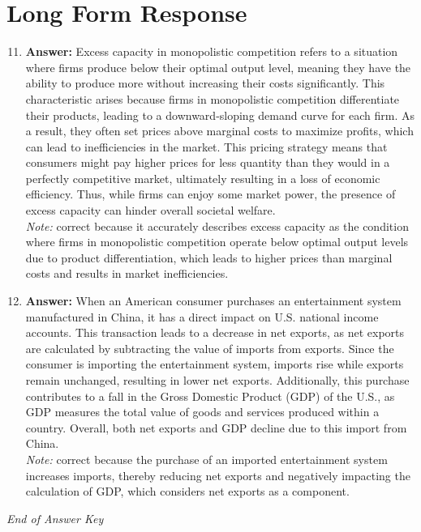 \documentclass[12pt]{article}
\begin{document}
\section*{Long Form Response}
\begin{enumerate}[label=\arabic*.]
\setcounter{enumi}{10}
\item \textbf{Answer:} Excess capacity in monopolistic competition refers to a situation where firms produce below their optimal output level, meaning they have the ability to produce more without increasing their costs significantly. This characteristic arises because firms in monopolistic competition differentiate their products, leading to a downward-sloping demand curve for each firm. As a result, they often set prices above marginal costs to maximize profits, which can lead to inefficiencies in the market. This pricing strategy means that consumers might pay higher prices for less quantity than they would in a perfectly competitive market, ultimately resulting in a loss of economic efficiency. Thus, while firms can enjoy some market power, the presence of excess capacity can hinder overall societal welfare.
\\ \textit{Note:} correct because it accurately describes excess capacity as the condition where firms in monopolistic competition operate below optimal output levels due to product differentiation, which leads to higher prices than marginal costs and results in market inefficiencies.
\item \textbf{Answer:} When an American consumer purchases an entertainment system manufactured in China, it has a direct impact on U.S. national income accounts. This transaction leads to a decrease in net exports, as net exports are calculated by subtracting the value of imports from exports. Since the consumer is importing the entertainment system, imports rise while exports remain unchanged, resulting in lower net exports. Additionally, this purchase contributes to a fall in the Gross Domestic Product (GDP) of the U.S., as GDP measures the total value of goods and services produced within a country. Overall, both net exports and GDP decline due to this import from China.
\\ \textit{Note:} correct because the purchase of an imported entertainment system increases imports, thereby reducing net exports and negatively impacting the calculation of GDP, which considers net exports as a component.
\end{enumerate}

\vfill
\noindent\textit{End of Answer Key}
\end{document}
